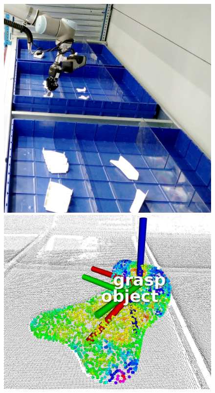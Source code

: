 \begin{figure}[h!]
{\begin{tcolorbox}
	\includegraphics[height=.15\textheight]{Cap5/Figuras/picking_embraer/side-3}\\
	\includegraphics[height=.15\textheight]{Cap5/Figuras/picking_embraer/perception-4}

\end{tcolorbox}}
\end{figure}
